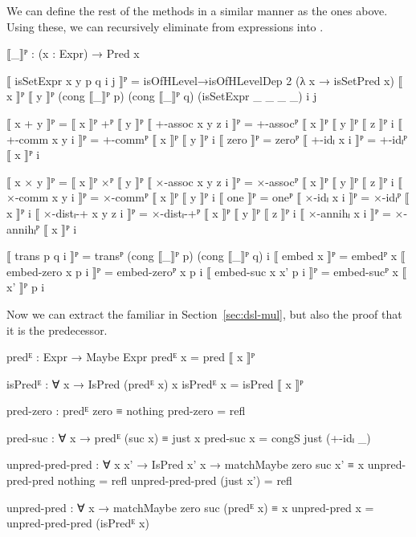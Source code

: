 We can define the rest of the methods in a similar manner as the ones above.
Using these, we can recursively eliminate from expressions into
.
\begin{code}
  ⟦_⟧ᴾ : (x : Expr) → Pred x
\end{code}
\begin{code}[hide]
  ⟦ isSetExpr x y p q i j ⟧ᴾ =
    isOfHLevel→isOfHLevelDep 2 (λ x → isSetPred x)
      ⟦ x ⟧ᴾ ⟦ y ⟧ᴾ (cong ⟦_⟧ᴾ p) (cong ⟦_⟧ᴾ q) (isSetExpr _ _ _ _) i j

  ⟦ x + y ⟧ᴾ = ⟦ x ⟧ᴾ +ᴾ ⟦ y ⟧ᴾ
  ⟦ +-assoc x y z i ⟧ᴾ = +-assocᴾ ⟦ x ⟧ᴾ ⟦ y ⟧ᴾ ⟦ z ⟧ᴾ i
  ⟦ +-comm x y i ⟧ᴾ = +-commᴾ ⟦ x ⟧ᴾ ⟦ y ⟧ᴾ i
  ⟦ zero ⟧ᴾ = zeroᴾ
  ⟦ +-idₗ x i ⟧ᴾ = +-idₗᴾ ⟦ x ⟧ᴾ i

  ⟦ x × y ⟧ᴾ = ⟦ x ⟧ᴾ ×ᴾ ⟦ y ⟧ᴾ
  ⟦ ×-assoc x y z i ⟧ᴾ = ×-assocᴾ ⟦ x ⟧ᴾ ⟦ y ⟧ᴾ ⟦ z ⟧ᴾ i
  ⟦ ×-comm x y i ⟧ᴾ = ×-commᴾ ⟦ x ⟧ᴾ ⟦ y ⟧ᴾ i
  ⟦ one ⟧ᴾ = oneᴾ
  ⟦ ×-idₗ x i ⟧ᴾ = ×-idₗᴾ ⟦ x ⟧ᴾ i
  ⟦ ×-distₗ-+ x y z i ⟧ᴾ = ×-distₗ-+ᴾ ⟦ x ⟧ᴾ ⟦ y ⟧ᴾ ⟦ z ⟧ᴾ i
  ⟦ ×-annihₗ x i ⟧ᴾ = ×-annihₗᴾ ⟦ x ⟧ᴾ i

  ⟦ trans p q i ⟧ᴾ = transᴾ (cong ⟦_⟧ᴾ p) (cong ⟦_⟧ᴾ q) i
  ⟦ embed x ⟧ᴾ = embedᴾ x
  ⟦ embed-zero x p i ⟧ᴾ = embed-zeroᴾ x p i
  ⟦ embed-suc x x' p i ⟧ᴾ = embed-sucᴾ x ⟦ x' ⟧ᴾ p i
\end{code}

Now we can extract the familiar  in
Section~\ref{sec:dsl-mul}, but also the proof that it is the predecessor.
\begin{code}
  predᴱ : Expr → Maybe Expr
  predᴱ x = pred ⟦ x ⟧ᴾ

  isPredᴱ : ∀ x → IsPred (predᴱ x) x
  isPredᴱ x = isPred ⟦ x ⟧ᴾ
\end{code}
\begin{code}[hide]
  pred-zero : predᴱ zero ≡ nothing
  pred-zero = refl

  pred-suc : ∀ x → predᴱ (suc x) ≡ just x
  pred-suc x = congS just (+-idₗ _)

  unpred-pred-pred : ∀ {x x'} → IsPred x' x → matchMaybe zero suc x' ≡ x
  unpred-pred-pred nothing = refl
  unpred-pred-pred (just x') = refl

  unpred-pred : ∀ x → matchMaybe zero suc (predᴱ x) ≡ x
  unpred-pred x = unpred-pred-pred (isPredᴱ x)
\end{code}

